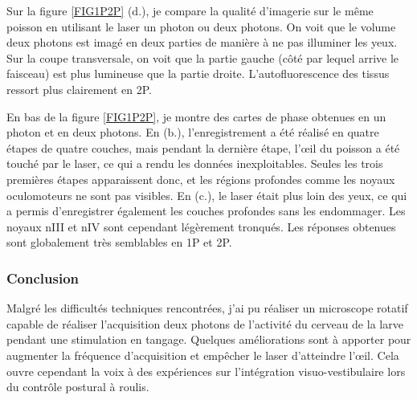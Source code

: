 Sur la figure \ref{FIG1P2P} (d.), je compare la qualité d'imagerie sur le même poisson en utilisant le laser un photon ou deux photons. On voit que le volume deux photons est imagé en deux parties de manière à ne pas illuminer les yeux. Sur la coupe transversale, on voit que la partie gauche (côté par lequel arrive le faisceau) est plus lumineuse que la partie droite. L'autofluorescence des tissus ressort plus clairement en 2P.

En bas de la figure \ref{FIG1P2P}, je montre des cartes de phase obtenues en un photon et en deux photons. En (b.), l'enregistrement a été réalisé en quatre étapes de quatre couches, mais pendant la dernière étape, l'œil du poisson a été touché par le laser, ce qui a rendu les données inexploitables. Seules les trois premières étapes apparaissent donc, et les régions profondes comme les noyaux oculomoteurs ne sont pas visibles. En (c.), le laser était plus loin des yeux, ce qui a permis d'enregistrer également les couches profondes sans les endommager. Les noyaux nIII et nIV sont cependant légèrement tronqués. Les réponses obtenues sont globalement très semblables en 1P et 2P.

\subsubsection{Conclusion}

Malgré les difficultés techniques rencontrées, j'ai pu réaliser un microscope rotatif capable de réaliser l'acquisition deux photons de l'activité du cerveau de la larve pendant une stimulation en tangage. Quelques améliorations sont à apporter pour augmenter la fréquence d'acquisition et empêcher le laser d'atteindre l'œil. Cela ouvre cependant la voix à des expériences sur l'intégration visuo-vestibulaire lors du contrôle postural à roulis.